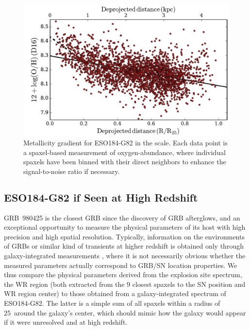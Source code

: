 \documentclass[traditabstract, referee]{aa}
\begin{document}
\begin{figure}
\includegraphics[angle=0, width=0.99\columnwidth]{Figs/MUSE_SN1998bw_metgrad.pdf}
\caption{Metallicity gradient for ESO184-G82 in  the \citet{2016Ap&SS.361...61D} scale. Each data point is a spaxel-based measurement of oxygen-abundance, where individual spaxels have been binned with their direct neighbors to enhance the signal-to-noise ratio if necessary.}
\label{fig:metgrad}
\end{figure}

\subsection{ESO184-G82 if Seen at High Redshift}
\label{sec:int}

{GRB~980425 is the closest GRB since the discovery of GRB afterglows}, and an exceptional opportunity to measure the physical parameters of its host with high precision and high spatial resolution. Typically, information on the environments of GRBs or similar kind of transients at higher redshift is obtained only through galaxy-integrated measurements \citep{2015A&A...581A.125K, 2016A&A...590A.129J, 2017A&A...599A.120V}, where it is not necessarily obvious whether the measured parameters actually correspond to GRB/SN location properties. {We thus compare the physical parameters derived from the explosion site spectrum, the WR region (both extracted from the 9 closest spaxels to the SN position and WR region center) to those obtained from a galaxy-integrated spectrum of ESO184-G82. The latter is a simple sum of all spaxels within a radius of 25\arcsec~around the galaxy's center, which should mimic how the galaxy would appear if it were unresolved and at high redshift.}
\end{document}
